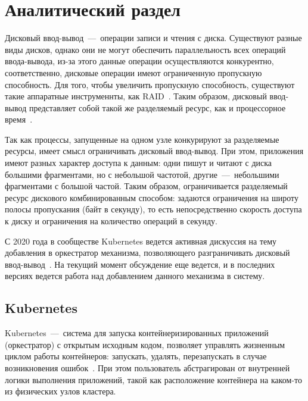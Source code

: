 \chapter{Аналитический раздел}



Дисковый ввод-вывод~---~операции записи и чтения с диска. Существуют разные виды дисков, однако они не могут обеспечить параллельность всех операций ввода-вывода, из-за этого данные операции осуществляются конкурентно, соответственно, дисковые операции имеют ограниченную пропускную способность. Для того, чтобы увеличить пропускную способность, существуют такие аппаратные инструменнты, как RAID~\cite{chen1994raid}. Таким образом, дисковый ввод-вывод представляет собой такой же разделяемый ресурс, как и процессорное время~\cite{кузьминский2012контрольные}.

Так как процессы, запущенные на одном узле конкурируют за разделяемые ресурсы, имеет смысл ограничивать дисковый ввод-вывод. При этом, приложения имеют разных характер доступа к данным: одни пишут и читают с диска большими  фрагментами, но с небольшой частотой, другие~---~небольшими фрагментами с большой частой. Таким образом, ограничивается разделяемый ресурс дискового комбинированным способом: задаются ограничения на широту полосы пропускания (байт в секунду), то есть непосредственно скорость доступа к диску и ограничения на количество операций в секунду.

С 2020 года в сообществе Kubernetes ведется активная дискуссия на тему добавления в оркестратор механизма, позволяющего разграничивать дисковый ввод-вывод~\cite{k8s_iops_limit_github}. На текущий момент обсуждение еще ведется, и в последних версиях ведется работа над добавлением данного механизма в систему.

\section{Kubernetes}

Kubernetes~---~система для запуска контейнеризированных приложений (оркестратор) с открытым исходным кодом, позволяет управлять жизненным циклом работы контейнеров: запускать, удалять, перезапускать в случае возникновения ошибок~\cite{kubernetes}. При этом пользователь абстрагирован от внутренней логики выполнения приложений, такой как расположение контейнера на каком-то из физических узлов кластера.

